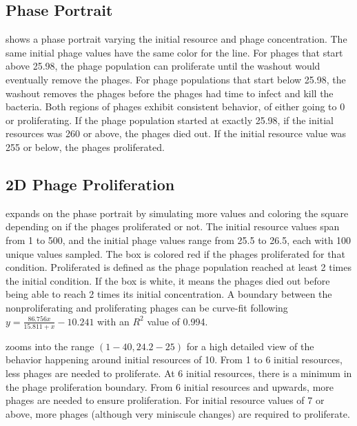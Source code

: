 \subsection{Phase Portrait}
 shows a phase portrait varying the initial resource and phage concentration. 
The same initial phage values have the same color for the line. 
For phages that start above 25.98, the phage population can proliferate until the washout would eventually remove the phages. 
For phage populations that start below 25.98, the washout removes the phages before the phages had time to infect and kill the bacteria. 
Both regions of phages exhibit consistent behavior, of either going to 0 or proliferating. 
If the phage population started at exactly 25.98, if the initial resources was 260 or above, the phages died out. 
If the initial resource value was 255 or below, the phages proliferated. 

\subsection{2D Phage Proliferation}
 expands on the phase portrait by simulating more values and coloring the square depending on if the phages proliferated or not. 
The initial resource values span from 1 to 500, and the initial phage values range from 25.5 to 26.5, each with 100 unique values sampled.
The box is colored red if the phages proliferated for that condition. 
Proliferated is defined as the phage population reached at least 2 times the initial condition. 
If the box is white, it means the phages died out before being able to reach 2 times its initial concentration. 
A boundary between the nonproliferating and proliferating phages can be curve-fit following $y=\frac{86.756x}{15.811+x} - 10.241$ with an $R^2$ value of 0.994. 

 zooms into the range $(1-40, 24.2-25)$ for a high detailed view of the behavior happening around initial resources of 10. 
From 1 to 6 initial resources, less phages are needed to proliferate. 
At 6 initial resources, there is a minimum in the phage proliferation boundary. 
From 6 initial resources and upwards, more phages are needed to ensure proliferation. 
For initial resource values of 7 or above, more phages (although very miniscule changes) are required to proliferate. 

